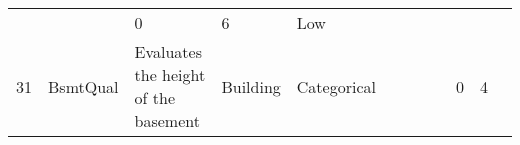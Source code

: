 \documentclass[11pt]{article}
\begin{document}
\begin{longtable}[]{@{}llllllllllll@{}}
\begin{minipage}[t]{0.04\columnwidth}
\strut
\end{minipage} & \begin{minipage}[t]{0.04\columnwidth}\raggedright\strut
\strut
\end{minipage} & \begin{minipage}[t]{0.04\columnwidth}\raggedright\strut
0\strut
\end{minipage} & \begin{minipage}[t]{0.04\columnwidth}\raggedright\strut
6\strut
\end{minipage} & \begin{minipage}[t]{0.04\columnwidth}\raggedright\strut
Low\strut
\end{minipage}\tabularnewline
\begin{minipage}[t]{0.04\columnwidth}\raggedright\strut
31\strut
\end{minipage} & \begin{minipage}[t]{0.04\columnwidth}\raggedright\strut
BsmtQual\strut
\end{minipage} & \begin{minipage}[t]{0.04\columnwidth}\raggedright\strut
Evaluates the height of the basement\strut
\end{minipage} & \begin{minipage}[t]{0.04\columnwidth}\raggedright\strut
Building\strut
\end{minipage} & \begin{minipage}[t]{0.04\columnwidth}\raggedright\strut
Categorical\strut
\end{minipage} & \begin{minipage}[t]{0.04\columnwidth}\raggedright\strut
\strut
\end{minipage} & \begin{minipage}[t]{0.04\columnwidth}\raggedright\strut
\strut
\end{minipage} & \begin{minipage}[t]{0.04\columnwidth}\raggedright\strut
\strut
\end{minipage} & \begin{minipage}[t]{0.04\columnwidth}\raggedright\strut
\strut
\end{minipage} & \begin{minipage}[t]{0.04\columnwidth}\raggedright\strut
0\strut
\end{minipage} & \begin{minipage}[t]{0.04\columnwidth}\raggedright\strut
4\strut
\end{minipage} & \begin{minipage}[t]{0.04\columnwidth}\raggedright\strut

\end{minipage}
\end{longtable}
\end{document}
